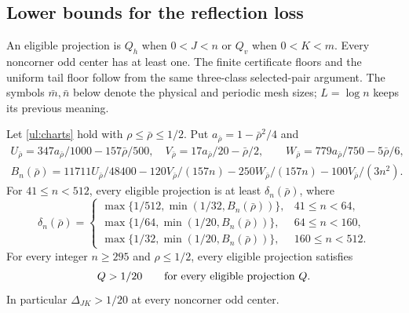 \subsection{Lower bounds for the reflection loss}

An eligible projection is $Q_h$ when $0<J<n$ or $Q_v$ when $0<K<m$.
Every noncorner odd center has at least one. The finite certificate
floors and the uniform tail floor follow from the same three-class
selected-pair argument. The symbols $\bar m,\bar n$ below denote
the physical and periodic mesh sizes; $L=\log n$ keeps its previous meaning.

\begin{lemma}\label{ul:selected-pairs}
Let \eqref{ul:charts} hold with $\rho\leq\bar\rho\leq1/2$.
Put $a_{\bar\rho}=1-\bar\rho^2/4$ and
\begin{gather*}
 U_{\bar\rho}=347a_{\bar\rho}/1000-157\bar\rho/500,
 \quad V_{\bar\rho}=17a_{\bar\rho}/20-\bar\rho/2,\qquad
 W_{\bar\rho}=779a_{\bar\rho}/750-5\bar\rho/6,\\
 B_n(\bar\rho)=11711U_{\bar\rho}/48400-120V_{\bar\rho}/(157n)
             -250W_{\bar\rho}/(157n)-100V_{\bar\rho}/(3n^2).
\end{gather*}
For $41\leq n<512$, every eligible projection is at least
$\delta_n(\bar\rho)$, where
\begin{equation}\label{ul:finite-floors}
 \delta_n(\bar\rho)=
 \begin{cases}
 \max\{1/512,\min(1/32,B_n(\bar\rho))\},&41\leq n<64,\\
 \max\{1/64,\min(1/20,B_n(\bar\rho))\},&64\leq n<160,\\
 \max\{1/32,\min(1/20,B_n(\bar\rho))\},&160\leq n<512.
 \end{cases}
\end{equation}
For every integer $n\geq295$ and $\rho\leq1/2$, every eligible
projection satisfies
\begin{equation}\label{ul:uniform-floor}
 Q>1/20\qquad\hbox{for every eligible projection }Q.
\end{equation}
In particular $\Delta_{JK}>1/20$ at every noncorner odd center.
\end{lemma}

